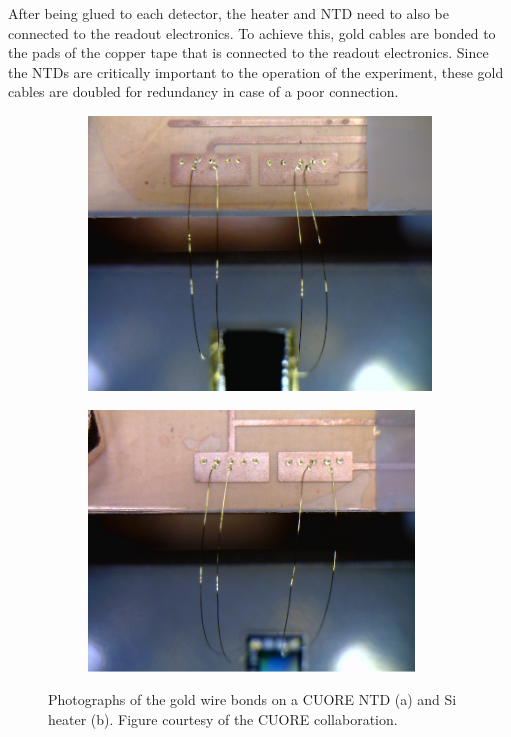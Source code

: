 After being glued to each detector, the heater and NTD need to also be connected to the readout electronics.
To achieve this, gold cables are bonded to the pads of the copper tape that is connected to the readout electronics.
Since the NTDs are critically important to the operation of the experiment, these gold cables are doubled for redundancy in case of a poor connection.

\begin{figure}[htbp]
\centering
\begin{subfigure}[t]{0.45\textwidth}
\centering
    \includegraphics[width=0.95\linewidth]{Figures/NTD_bond.png}
\caption{}
\label{fig:bond_NTD}
\end{subfigure}
\qquad
\begin{subfigure}[t]{0.45\textwidth}
\centering
\includegraphics[width=0.95\textwidth]{Figures/Si_bond.png}
\caption{}
\label{fig:bond_Si}
\end{subfigure}
\caption[Photographs of the gold wire bonds on a CUORE NTD (a) and Si heater (b)]
{Photographs of the gold wire bonds on a CUORE NTD (a) and Si heater (b).
Figure courtesy of the CUORE collaboration.}
\label{fig:bonds}
\end{figure}

